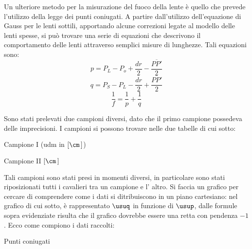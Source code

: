 Un ulteriore metodo per la misurazione del fuoco della lente è quello che prevede l'utilizzo della legge dei punti coniugati.
 A partire dall'utilizzo dell'equazione di Gauss per le lenti sottili, apportando alcune correzioni legate al modello delle lenti
 spesse, si può trovare una serie di equazioni che descrivono il comportamento delle lenti attraverso semplici misure di
 lunghezze. Tali equazioni sono:
\[p=P_L - P_o + \frac {dr} {2} - \frac {\overline{PP'}}{2}\]
\[q=P_S - P_L -\frac {dr} {2} + \frac {\overline{PP'}} {2}\]
\[\frac{1}{f} = \frac {1}{p} + \frac {1}{q}\]

 Sono stati prelevati due campioni diversi, dato che il primo campione possedeva delle imprecisioni. I campioni si possono trovare
 nelle due tabelle di cui sotto:
\begin{tabella}
	\centering
	
	\caption{Campione I (udm in $[\cm\,]$)}
	\label{tab:02tab1}
\end{tabella}

\begin{tabella}
	\centering
	
	\caption{Campione II $[\cm\,]$}
	\label{tab:02tab2}
\end{tabella}

Tali campioni sono stati presi in momenti diversi, in particolare sono stati riposizionati tutti i cavalieri tra un campione e l'
 altro. Si faccia un grafico per cercare di comprendere come i dati si ditribuiscono in un piano cartesiano: nel grafico di cui
 sotto, è rappresentato $\usuq$ in funzione di $\usup$, dalle formule sopra evidenziate risulta che il grafico dovrebbe essere una retta con
 pendenza $-1$. Ecco come compiono i dati raccolti:
\begin{grafico} \centering  \caption{Punti coniugati} \label{gr:02graph1.tex} \end{grafico}

